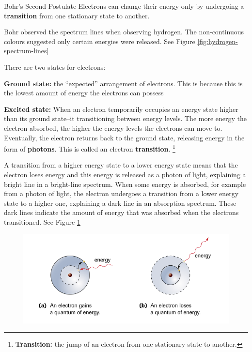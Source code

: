 \begin{definition}{Bohr's Second Postulate}
    Electrons can change their energy only by undergoing a \textbf{transition} from one stationary 
    state to another.
\end{definition}

\begin{bulleted-list}
    \item Bohr observed the spectrum lines when observing hydrogen. The non-continuous
        colours suggested only certain energies were released. See Figure \ref{fig:hydrogen-spectrum-lines}
    \item There are two states for electrons:
        \begin{enum}
            \item \textbf{Ground state:} the ``expected'' arrangement of electrons. This is because
                this is the lowest amount of energy the electrons can possess
            \item \textbf{Excited state:} When an electron temporarily occupies an energy state higher
                than its ground state--it transitioning between energy levels. The more energy the 
                electron absorbed, the higher the energy levels the electrons can move to. 
                Eventually, the electron returns back to the ground state, releasing energy
                in the form of \textbf{photons}. This is called an electron \textbf{transition}.
                \footnote{
                    \textbf{Transition:} the jump of an electron from one stationary state to
                    another.
                }
        \end{enum}
    \item A transition from a higher energy state to a lower energy state means that the electron
        loses energy and this energy is released as a photon of light, explaining a bright line
        in a bright-line spectrum. When some energy is absorbed, for example from a photon of
        light, the electron undergoes a transition from a lower energy state to a higher one,
        explaining a dark line in an absorption spectrum. These dark lines indicate the amount
        of energy that was absorbed when the electrons transitioned. See Figure \ref{fig:bohr-model-electron-transition}
\end{bulleted-list}

\begin{figure}[ht!]
    \centering
    \includegraphics[width=0.4 \textwidth]{../figures/bohr-model-electron-transition.png}
    \caption{}
    \label{fig:bohr-model-electron-transition}
\end{figure}

